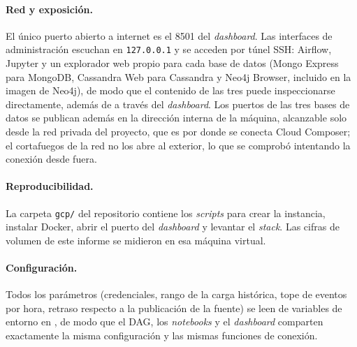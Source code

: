 \paragraph{Red y exposición.} El único puerto abierto a internet es el 8501 del \textit{dashboard}. Las interfaces de administración escuchan en \texttt{127.0.0.1} y se acceden por túnel SSH: Airflow, Jupyter y un explorador web propio para cada base de datos (Mongo Express para MongoDB, Cassandra Web para Cassandra y Neo4j Browser, incluido en la imagen de Neo4j), de modo que el contenido de las tres puede inspeccionarse directamente, además de a través del \textit{dashboard}. Los puertos de las tres bases de datos se publican además en la dirección interna de la máquina, alcanzable solo desde la red privada del proyecto, que es por donde se conecta Cloud Composer; el cortafuegos de la red no los abre al exterior, lo que se comprobó intentando la conexión desde fuera.

\paragraph{Reproducibilidad.} La carpeta \texttt{gcp/} del repositorio contiene los \textit{scripts} para crear la instancia, instalar Docker, abrir el puerto del \textit{dashboard} y levantar el \textit{stack}. Las cifras de volumen de este informe se midieron en esa máquina virtual.

\paragraph{Configuración.} Todos los parámetros (credenciales, rango de la carga histórica, tope de eventos por hora, retraso respecto a la publicación de la fuente) se leen de variables de entorno en , de modo que el DAG, los \textit{notebooks} y el \textit{dashboard} comparten exactamente la misma configuración y las mismas funciones de conexión.
